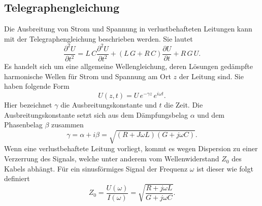 \subsection{Telegraphengleichung}
Die Ausbreitung von Strom und Spannung in verlustbehafteten Leitungen kann mit der Telegraphengleichung beschrieben werden. Sie lautet
\begin{equation}
  \frac{\partial^2 U}{\partial t^2} = L\,C\frac{\partial^2 U}{\partial t^2}+(L\,G + R\,C)\frac{\partial U}{\partial t}+R\,G\,U.
\end{equation}
Es handelt sich um eine allgemeine Wellengleichung, deren Lösungen gedämpfte harmonische Wellen für Strom und Spannung am Ort $z$ der Leitung sind. Sie haben folgende Form
\begin{equation}
  U(z,t)=U\,e^{-\gamma z}\,e^{i\omega t}.
\end{equation}
Hier bezeichnet $\gamma$ die Ausbreitungskonstante und $t$ die Zeit. Die Ausbreitungskonstante setzt sich aus dem Dämpfungsbelag $\alpha$ und dem Phasenbelag $\beta$ zusammen
\begin{equation}
  \gamma =\alpha+i\beta=\sqrt{(R+J\omega L)(G+j\omega C)}.
\end{equation}
Wenn eine verlustbehaftete Leitung vorliegt, kommt es wegen Dispersion zu einer Verzerrung des Signals, welche unter anderem vom Wellenwiderstand $Z_0$ des Kabels abhängt. Für ein sinusförmiges Signal der Frequenz $\omega$ ist dieser wie folgt definiert
\begin{equation}
  Z_0=\frac{U(\omega)}{I(\omega)}=\sqrt{\frac{R+j\omega L}{G+j\omega C}}.
\end{equation}

